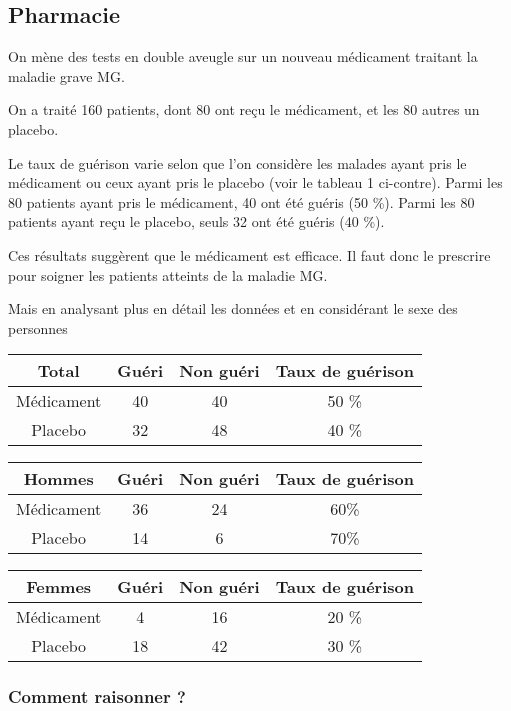 \documentclass[10pt,dvipsnames, dvips, svgnames]{article}
\begin{document}
\subsection{Pharmacie}



On mène des tests en double aveugle sur un nouveau médicament traitant la maladie grave MG.

On a traité 160 patients, dont 80 ont reçu le médicament, et les 80 autres un placebo.

Le taux de guérison varie selon que l'on considère les malades ayant pris le médicament ou ceux ayant pris le placebo (voir le tableau 1 ci-contre). Parmi les 80 patients ayant pris le médicament, 40 ont été guéris (50 \%). Parmi les 80 patients ayant reçu le placebo, seuls 32 ont été guéris (40 \%).

Ces résultats suggèrent que le médicament est efficace. Il faut donc le prescrire pour soigner les patients atteints de la maladie MG.

Mais en analysant plus en détail les données et en considérant le sexe des personnes

\begin{tabular}[]{|c |c |c |c |}
	\hline Total & Guéri & Non guéri & Taux de guérison \\
	\hline Médicament & 40  & 40  & 50 \% \\
	\hline Placebo & 32 &  48 & 40 \% \\
	\hline 
\end{tabular} 


\begin{tabular}[]{|c |c |c |c |}
	\hline Hommes & Guéri & Non guéri & Taux de guérison \\
	\hline Médicament & 36  & 24  & 60\% \\
	\hline Placebo & 14 & 6 & 70\% \\
	\hline 
\end{tabular} 




\begin{tabular}[]{|c |c |c |c |}
\hline  Femmes & Guéri & Non guéri &Taux de guérison \\
\hline Médicament & 4 & 16 & 20 \% \\
\hline   Placebo  & 18 & 42 & 30 \%  \\
\hline 
\end{tabular} 

\subsubsection{ Comment raisonner ?}
\end{document}
